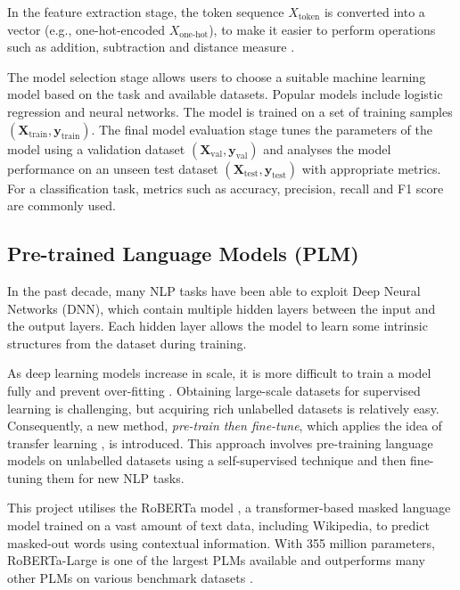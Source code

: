 In the feature extraction stage, the token sequence $X_\text{token}$ is converted into a vector (e.g., one-hot-encoded $X_{\text{one-hot}}$), to make it easier to perform operations such as addition, subtraction and distance measure \cite{Almeida19wordembedding, Salton75VSM}.

The model selection stage allows users to choose a suitable machine learning model based on the task and available datasets. Popular models include logistic regression and neural networks. The model is trained on a set of training samples $(\mathbf{X}_{\text{train}}, \mathbf{y}_{\text{train}})$. The final model evaluation stage tunes the parameters of the model using a validation dataset $(\mathbf{X}_\text{val}, \mathbf{y}_\text{val})$ and analyses the model performance on an unseen test dataset $(\mathbf{X}_\text{test}, \mathbf{y}_\text{test})$ with appropriate metrics. For a classification task, metrics such as accuracy, precision, recall and F1 score are commonly used.    

\subsection{Pre-trained Language Models (PLM)} 
In the past decade, many NLP tasks have been able to exploit Deep Neural Networks (DNN)\cite{Yann15dnn}, which contain multiple hidden layers between the input and the output layers. Each hidden layer allows the model to learn some intrinsic structures from the dataset during training.

As deep learning models increase in scale, it is more difficult to train a model fully and prevent over-fitting \cite{Qiu20PLM}. Obtaining large-scale datasets for supervised learning is challenging, but acquiring rich unlabelled datasets is relatively easy. Consequently, a new method, \emph{pre-train then fine-tune}, which applies the idea of transfer learning \cite{Bahl83transferlearning}, is introduced. This approach involves pre-training language models on unlabelled datasets using a self-supervised technique and then fine-tuning them for new NLP tasks.

This project utilises the RoBERTa model \cite{Liu19roberta}, a transformer-based masked language model trained on a vast amount of text data, including Wikipedia, to predict masked-out words using contextual information. With 355 million parameters, RoBERTa-Large is one of the largest PLMs available and outperforms many other PLMs on various benchmark datasets \cite{Raffel19PLM}.

